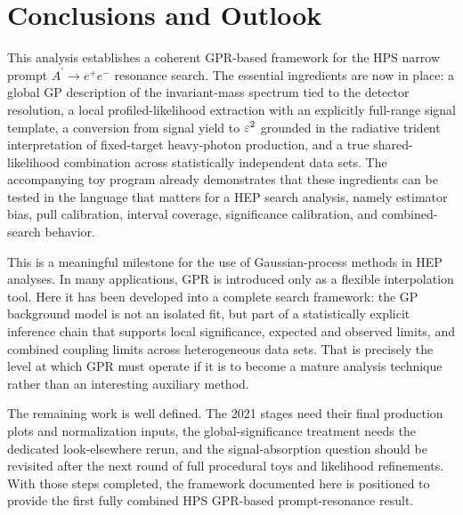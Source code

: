\section{Conclusions and Outlook}
\label{sec:conclusions}

This analysis establishes a coherent GPR-based framework for the HPS narrow prompt
$A^\prime \rightarrow e^+e^-$ resonance search. The essential ingredients are now in
place: a global GP description of the invariant-mass spectrum tied to the detector
resolution, a local profiled-likelihood extraction with an explicitly full-range signal
template, a conversion from signal yield to $\varepsilon^2$ grounded in the radiative trident
interpretation of fixed-target heavy-photon production, and a true shared-likelihood
combination across statistically independent data sets. The accompanying toy program
already demonstrates that these ingredients can be tested in the language that matters
for a HEP search analysis, namely estimator bias, pull calibration, interval coverage,
significance calibration, and combined-search behavior.

This is a meaningful milestone for the use of Gaussian-process methods in HEP analyses.
In many applications, GPR is introduced only as a flexible interpolation tool. Here it
has been developed into a complete search framework: the GP background model is not an
isolated fit, but part of a statistically explicit inference chain that supports local
significance, expected and observed limits, and combined coupling limits across
heterogeneous data sets. That is precisely the level at which GPR must operate if it is
to become a mature analysis technique rather than an interesting auxiliary method.

The remaining work is well defined. The 2021 stages need their final production plots
and normalization inputs, the global-significance treatment needs the dedicated
look-elsewhere rerun, and the signal-absorption question should be revisited after the
next round of full procedural toys and likelihood refinements. With those steps
completed, the framework documented here is positioned to provide the first fully
combined HPS GPR-based prompt-resonance result.
